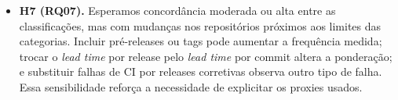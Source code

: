 \begin{itemize}
  contribuidores apresentem associações mais claras com o desempenho DORA do que a linguagem
  principal. Aplicações e serviços devem publicar com maior frequência, enquanto comunidades
  maiores podem sustentar revisão, manutenção e recuperação mais contínuas. Popularidade, idade e
  linguagem podem apresentar associações menos uniformes; elas serão interpretadas sem atribuição
  de efeito causal.
  \item \textbf{H7 (RQ07).} Esperamos concordância moderada ou alta entre as classificações,
  mas com mudanças nos repositórios próximos aos limites das categorias. Incluir pré-releases ou
  tags pode aumentar a frequência medida; trocar o \textit{lead time} por release pelo \textit{lead
  time} por commit altera a ponderação; e substituir falhas de CI por releases corretivas observa
  outro tipo de falha. Essa sensibilidade reforça a necessidade de explicitar os proxies usados.
\end{itemize}
